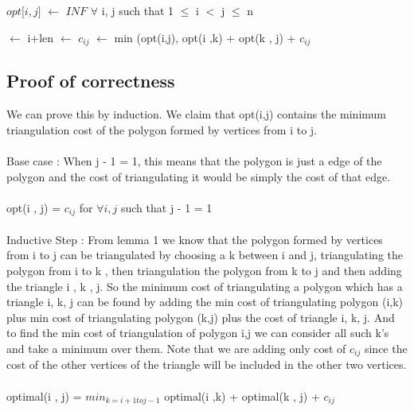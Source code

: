 \documentclass[12pt]{article}
\newcommand*\Let[2]{\State #1 $\gets$ #2}
\begin{document}
\begin{algorithm}[H]
  \caption{}
  \begin{algorithmic}[1]
		\Let{$opt\lbrack{i,j}\rbrack$}{$INF$} $\forall$ i, j such that 1 $\leq$ i $<$ j $\leq$ n 

					 $\gets$ {i+len}
						 $\gets$ {$c_{ij}$} 
					\Else		
							 $\gets$ {min{ (opt(i,j), opt(i ,k) + opt(k , j) + $c_{ij}$ }}
						\EndFor
					\EndIf	
			\EndFor
		\EndFor

		\State {}
	\EndProcedure
  \end{algorithmic}
\end{algorithm}
\subsection{Proof of correctness}

We can prove this by induction. We claim that opt(i,j) contains the minimum triangulation cost of the polygon formed by vertices from i to j. 
\\\\
Base case : When j - 1 = 1, this means that the polygon is just a edge of the polygon and the cost of triangulating it would be simply the cost of that edge.
\\\\
opt(i , j) = $c_{ij}$ for $\forall i, j$ such that  j - 1 = 1
\\\\
Inductive Step : From lemma 1 we know that the polygon formed by vertices from i to j can be triangulated by choosing a k between i and j, triangulating the polygon from i to k , then triangulation the polygon from k to j and then adding the triangle i , k , j. So the minimum cost of triangulating a polygon which has a triangle i, k, j can be found by adding the min cost of triangulating polygon (i,k) plus min cost of triangulating polygon (k,j) plus the cost of triangle i, k, j. And to find the min cost of triangulation of polygon i,j we can consider all such k's and take a minimum over them. Note that we are adding only cost of $c_{ij}$ since the cost of the other vertices of the triangle will be included in the other two vertices.
\\\\
optimal(i , j) =  $min_{k = i+1 to j-1}$ { optimal(i ,k) + optimal(k , j) + $c_{ij}$}
\end{document}
